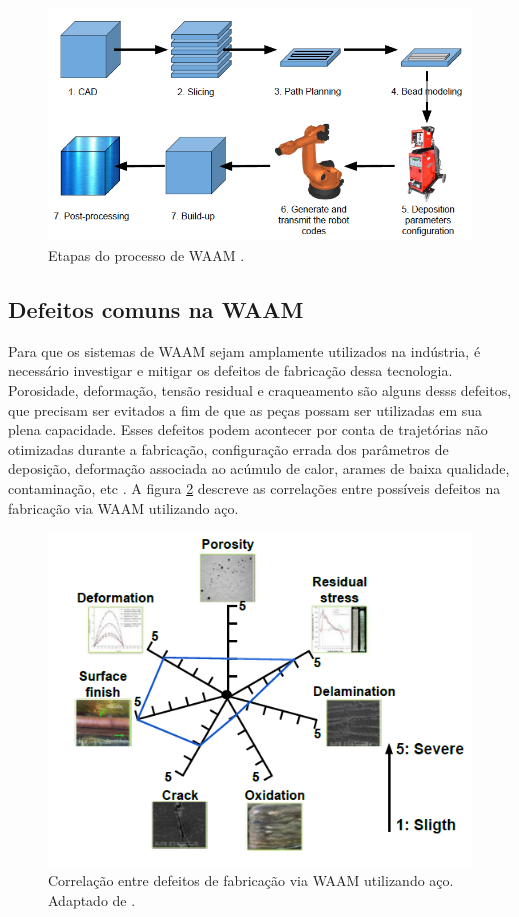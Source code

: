 \begin{figure}[hbt!]
    \centering
    \includegraphics[width=0.8\linewidth]{Imagens/chap02/waam_steps.png}
    \caption{Etapas do processo de WAAM \cite{ding2016bead}.}
    \label{fig:waam_steps}
\end{figure}

\subsection{Defeitos comuns na WAAM}
Para que os sistemas de WAAM sejam amplamente utilizados na indústria, é necessário investigar e mitigar os defeitos de fabricação dessa tecnologia. Porosidade, deformação, tensão residual e craqueamento são alguns desss defeitos, que precisam ser evitados a fim de que as peças possam ser utilizadas em sua plena capacidade. Esses defeitos podem acontecer por conta de trajetórias não otimizadas durante a fabricação, configuração errada dos parâmetros de deposição, deformação associada ao acúmulo de calor, arames de baixa qualidade, contaminação, etc \cite{wu2018review}. A figura \ref{fig:waam_defects} descreve as correlações entre possíveis defeitos na fabricação via WAAM utilizando aço. 

\begin{figure}[hbt!]
    \centering
    \includegraphics[width=0.8\linewidth]{Imagens/chap02/waam_defects.png}
    \caption{Correlação entre defeitos de fabricação via WAAM utilizando aço. Adaptado de \cite{wu2018review}.}
    \label{fig:waam_defects}
\end{figure}

